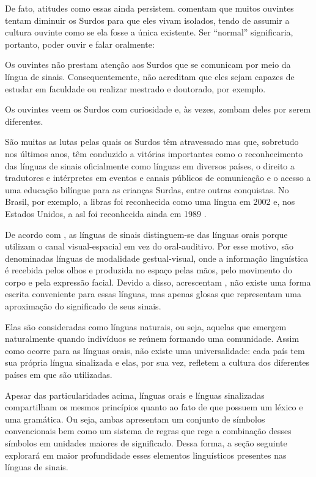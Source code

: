 De fato, atitudes como essas ainda persistem.  comentam que muitos ouvintes tentam  diminuir os Surdos para que eles vivam isolados, tendo de assumir a cultura ouvinte como se ela fosse a única existente. Ser ``normal'' significaria, portanto, poder ouvir e falar oralmente:


\begin{citacao}
    Os ouvintes não prestam atenção aos Surdos que se comunicam por meio da língua de sinais. Consequentemente, não acreditam que eles sejam capazes de estudar em faculdade ou realizar mestrado e  doutorado, por exemplo. \cite{pereira-2011-conhecimento-alem-sinais}
\end{citacao}

\begin{citacao}
    Os ouvintes veem os Surdos com curiosidade e, às vezes, zombam deles por serem diferentes. \cite{strobel-2016-cultura-surda}
\end{citacao}


São muitas as lutas pelas quais os Surdos têm atravessado mas que, sobretudo nos últimos anos, têm conduzido a vitórias importantes como o reconhecimento das línguas de sinais oficialmente como línguas em diversos países, o direito a tradutores e intérpretes em eventos e canais públicos de comunicação e o acesso a uma educação bilíngue para as crianças Surdas, entre outras conquistas. No Brasil, por exemplo, a \acrfull{libras} foi reconhecida como uma língua em 2002 e, nos Estados Unidos, a \acrfull{asl} foi reconhecida ainda em 1989 \cite{brasil-2002-lei10436,pereira-2011-conhecimento-alem-sinais, jay-2011-dont-just-sign}.



De acordo com , as línguas de sinais distinguem-se das línguas orais porque utilizam o canal visual-espacial em vez do oral-auditivo. Por esse motivo, são denominadas línguas de modalidade gestual-visual, onde a informação linguística é recebida pelos olhos e produzida no espaço pelas mãos, pelo movimento do corpo e pela expressão facial.
Devido a disso, acrescentam , não existe uma forma escrita conveniente para essas línguas, mas apenas glosas que representam uma aproximação do significado de seus sinais.

Elas são consideradas como línguas naturais, ou seja, aquelas que emergem naturalmente quando indivíduos se reúnem formando uma comunidade. Assim como ocorre para as línguas orais, não existe uma universalidade: cada país tem sua própria língua sinalizada e elas, por sua vez, refletem a cultura dos diferentes países em que são utilizadas.


Apesar das particularidades acima, línguas orais e línguas sinalizadas compartilham os mesmos princípios quanto ao fato de que possuem um léxico e uma gramática. Ou seja, ambas apresentam um conjunto de símbolos convencionais bem como um sistema de regras que rege a combinação desses símbolos em unidades maiores de significado.
Dessa forma, a seção seguinte explorará em maior profundidade esses elementos linguísticos presentes nas línguas de sinais.
